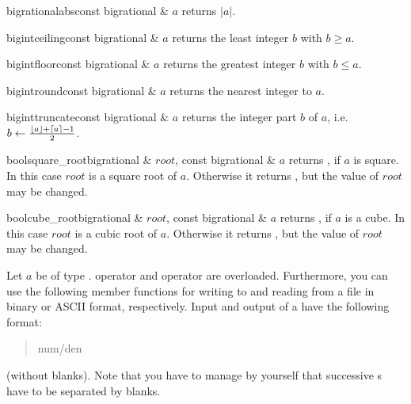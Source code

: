 \BASIC

\begin{fcode}{bigrational}{abs}{const bigrational & $a$}
  returns $|a|$.
\end{fcode}

\begin{fcode}{bigint}{ceiling}{const bigrational & $a$}
  returns the least integer $b$ with $b \geq a$.
\end{fcode}

\begin{fcode}{bigint}{floor}{const bigrational & $a$}
  returns the greatest integer $b$ with $b \leq a$.
\end{fcode}

\begin{fcode}{bigint}{round}{const bigrational & $a$}
  returns the nearest integer to $a$.
\end{fcode}

\begin{fcode}{bigint}{truncate}{const bigrational & $a$}
  returns the integer part $b$ of $a$, i.e.  $b \leftarrow \frac{\lfloor a \rfloor + \lceil a
    \rceil -1}{2}$.
\end{fcode}

\begin{fcode}{bool}{square_root}{bigrational & $\mathit{root}$, const bigrational & $a$}
  returns \TRUE, if $a$ is square.  In this case $\mathit{root}$ is a square root of $a$.
  Otherwise it returns \FALSE, but the value of $\mathit{root}$ may be changed.
\end{fcode}

\begin{fcode}{bool}{cube_root}{bigrational & $\mathit{root}$, const bigrational & $a$}
  returns \TRUE, if $a$ is a cube.  In this case $\mathit{root}$ is a cubic root of $a$.
  Otherwise it returns \FALSE, but the value of $\mathit{root}$ may be changed.
\end{fcode}



\IO

Let $a$ be of type .   operator \code{>>} and
 operator \code{<<} are overloaded.  Furthermore, you can use the following
member functions for writing to and reading from a file in binary or ASCII format, respectively.
Input and output of a  have the following format:
\begin{quote}
  num/den
\end{quote}
(without blanks).  Note that you have to manage by yourself that successive
s have to be separated by blanks.

